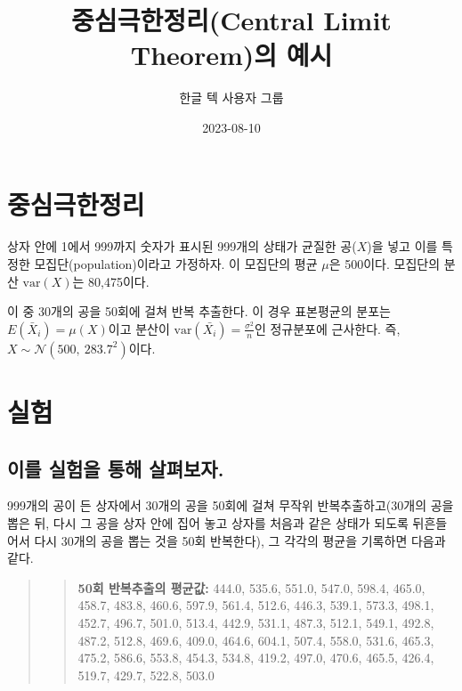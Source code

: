 \documentclass[
  chapter,a4paper,showtrims,openright,hidelinks]{oblivoir}
\title{중심극한정리(Central Limit Theorem)의 예시}
\author{한글 텍 사용자 그룹}
\date{2023-08-10}
\renewcommand*\contentsname{목 차}
\newcommand\contentsname{목 차}
\begin{document}
\maketitle
\renewcommand*\contentsname{목 차}
{
\hypersetup{linkcolor=}
\setcounter{tocdepth}{2}
\tableofcontents
}
\mainmatter
\pagestyle{demo}

\hypertarget{uxc911uxc2ecuxadf9uxd55cuxc815uxb9ac}{%
\chapter{중심극한정리}\label{uxc911uxc2ecuxadf9uxd55cuxc815uxb9ac}}

상자 안에 1에서 999까지 숫자가 표시된 999개의 상태가 균질한 공(\(X\))을
넣고 이를 특정한 모집단(population)이라고
가정하자. 이 모집단의 평균 \(\mu\)은
500이다. 모집단의 분산 \(\mathrm{var}(X)\)는
80,475이다.

이 중 30개의 공을 50회에 걸쳐 반복 추출한다. 이 경우
표본평균의 분포는 \(E(\bar{X}_i)=\mu(X)\)이고 분산이
\(\mathrm{var}(\bar{X_i})=\frac{\sigma^2}{n}\)인 정규분포에 근사한다.
즉, \(X \sim \mathcal{N}(500,~283.7^2)\)이다.

\hypertarget{uxc2e4uxd5d8}{%
\chapter{실험}\label{uxc2e4uxd5d8}}

\hypertarget{uxc774uxb97c-uxc2e4uxd5d8uxc744-uxd1b5uxd574-uxc0b4uxd3b4uxbcf4uxc790.}{%
\section{이를 실험을 통해
살펴보자.}\label{uxc774uxb97c-uxc2e4uxd5d8uxc744-uxd1b5uxd574-uxc0b4uxd3b4uxbcf4uxc790.}}

999개의 공이 든 상자에서 30개의 공을 50회에 걸쳐 무작위
반복추출하고(30개의 공을 뽑은 뒤, 다시 그 공을 상자 안에 집어 놓고
상자를 처음과 같은 상태가 되도록 뒤흔들어서 다시 30개의 공을 뽑는 것을
50회 반복한다), 그 각각의 평균을 기록하면 다음과
같다.

\begin{quote}
\begin{quote}
\textbf{50회 반복추출의 평균값:} 444.0, 535.6, 551.0, 547.0, 598.4,
465.0, 458.7, 483.8, 460.6, 597.9, 561.4, 512.6, 446.3, 539.1, 573.3,
498.1, 452.7, 496.7, 501.0, 513.4, 442.9, 531.1, 487.3, 512.1, 549.1,
492.8, 487.2, 512.8, 469.6, 409.0, 464.6, 604.1, 507.4, 558.0, 531.6,
465.3, 475.2, 586.6, 553.8, 454.3, 534.8, 419.2, 497.0, 470.6, 465.5,
426.4, 519.7, 429.7, 522.8, 503.0
\end{quote}
\end{quote}
\end{document}
